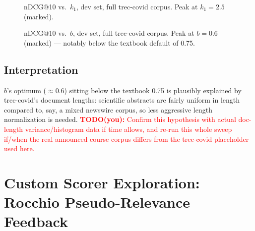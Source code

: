 \documentclass[11pt]{article}
\newcommand{\todo}[1]{\textcolor{red}{\textbf{TODO(you):} #1}}
\begin{document}
\begin{figure}[h]
\centering
{}
\caption{nDCG@10 vs.\ $k_1$, dev set, full trec-covid corpus. Peak at
$k_1{=}2.5$ (marked).}
\label{fig:k1}
\end{figure}

\begin{figure}[h]
\centering
{}
\caption{nDCG@10 vs.\ $b$, dev set, full trec-covid corpus. Peak at
$b{=}0.6$ (marked) --- notably below the textbook default of 0.75.}
\label{fig:b}
\end{figure}

\subsection{Interpretation}
$b$'s optimum ($\approx 0.6$) sitting below the textbook 0.75 is
plausibly explained by trec-covid's document lengths: scientific
abstracts are fairly uniform in length compared to, say, a mixed
newswire corpus, so less aggressive length normalization is needed.
\todo{Confirm this hypothesis with actual doc-length variance/histogram
data if time allows, and re-run this whole sweep if/when the real
announced course corpus differs from the trec-covid placeholder used
here.}

\section{Custom Scorer Exploration: Rocchio Pseudo-Relevance Feedback}
\end{document}
